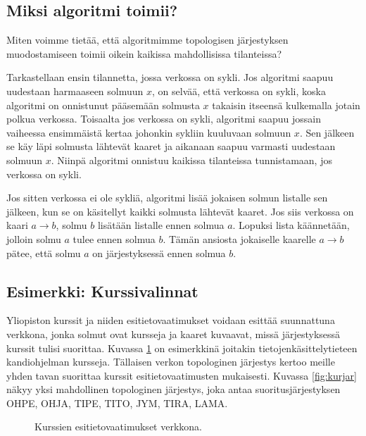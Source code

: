 \subsection{Miksi algoritmi toimii?}

Miten voimme tietää, että algoritmimme topologisen
järjestyksen muodostamiseen toimii
oikein kaikissa mahdollisissa tilanteissa?

Tarkastellaan ensin tilannetta, jossa verkossa on sykli.
Jos algoritmi saapuu uudestaan harmaaseen solmuun $x$,
on selvää, että verkossa on sykli,
koska algoritmi on onnistunut pääsemään solmusta $x$
takaisin itseensä kulkemalla jotain polkua verkossa.
Toisaalta jos verkossa on sykli, algoritmi saapuu
jossain vaiheessa ensimmäistä kertaa johonkin sykliin
kuuluvaan solmuun $x$. Sen jälkeen se käy läpi solmusta
lähtevät kaaret ja aikanaan saapuu varmasti uudestaan
solmuun $x$. Niinpä algoritmi onnistuu kaikissa tilanteissa tunnistamaan,
jos verkossa on sykli.

Jos sitten verkossa ei ole sykliä, algoritmi lisää jokaisen
solmun listalle sen jälkeen, kun se on käsitellyt
kaikki solmusta lähtevät kaaret.
Jos siis verkossa on kaari $a \rightarrow b$,
solmu $b$ lisätään listalle ennen solmua $a$.
Lopuksi lista käännetään, jolloin solmu $a$
tulee ennen solmua $b$.
Tämän ansiosta jokaiselle kaarelle $a \rightarrow b$ pätee,
että solmu $a$ on järjestyksessä ennen solmua $b$.

\subsection{Esimerkki: Kurssivalinnat}

Yliopiston kurssit ja niiden esitietovaatimukset voidaan esittää 
suunnattuna verkkona, jonka solmut ovat kursseja ja kaaret kuvaavat,
missä järjestyksessä kurssit tulisi suorittaa.
Kuvassa \ref{fig:kuresi} on esimerkkinä joitakin
tietojenkäsittely\-tieteen kandiohjelman kursseja.
Tällaisen verkon topologinen järjestys kertoo meille
yhden tavan suorittaa kurssit esitietovaatimusten mukaisesti.
Kuvassa \ref{fig:kurjar} näkyy yksi mahdollinen topologinen järjestys,
joka antaa suoritusjärjestyksen
OHPE, OHJA, TIPE, TITO, JYM, TIRA, LAMA.

\begin{figure}
\center
\begin{center}
\end{center}
\caption{Kurssien esitietovaatimukset verkkona.}
\label{fig:kuresi}
\end{figure}


